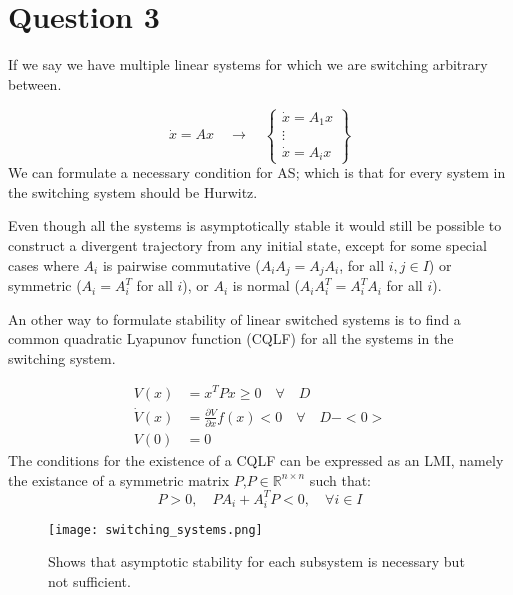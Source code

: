 \chapter{Question 3}
If we say we have multiple linear systems for which we are switching arbitrary between.

\begin{equation}
        \dot{x} = Ax \quad \rightarrow \quad
        \begin{Bmatrix}
                \dot{x} = A_1 x \\
                \vdots \\
                \dot{x} = A_i x
        \end{Bmatrix}
\end{equation}
We can formulate a necessary condition for AS; which is that for every system in the switching system should be Hurwitz.

Even though all the systems is asymptotically stable it would still be possible to construct a divergent trajectory from any initial state, except for some special cases where $A_i$ is pairwise commutative ($A_iA_j = A_j A_i$, for all $i,j \in I$) or symmetric ($A_i = A_i^T$ for all $i$), or $A_i$ is normal ($A_iA_i^T = A_i^T A_i$ for all $i$).

An other way to formulate stability of linear switched systems is to find a common quadratic Lyapunov function (CQLF) for all the systems in the switching system.

\begin{equation}
        \begin{split}
                V(x) &= x^T P x \geq 0 \quad \forall \quad D \\
                \dot{V}(x) &= \frac{\partial V}{\partial x} f(x) < 0 \quad \forall \quad D - <0> \\
                V(0) &= 0
        \end{split}
\end{equation}
The conditions for the existence of a CQLF can be expressed as an LMI, namely the existance of a symmetric matrix $P$,$P \in \mathbb{R}^{n\times n}$ such that:
\begin{equation}
        P > 0, \quad PA_i + A_i^TP < 0, \quad \forall i \in I
\end{equation}

\begin{figure}[htbp]
        \centering
        \texttt{[image: switching\_systems.png]}
        \caption{Shows that asymptotic stability for each subsystem is necessary but not sufficient.}
        \label{fig:switching_systems}
\end{figure}